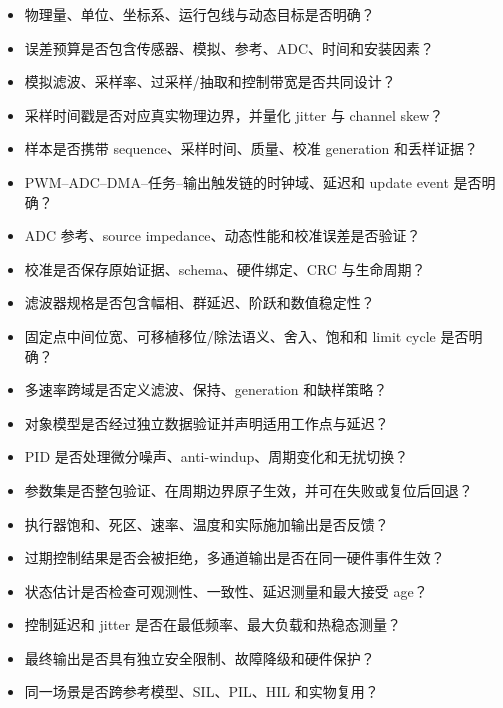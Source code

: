 \begin{itemize}
  \item 物理量、单位、坐标系、运行包线与动态目标是否明确？
  \item 误差预算是否包含传感器、模拟、参考、ADC、时间和安装因素？
  \item 模拟滤波、采样率、过采样/抽取和控制带宽是否共同设计？
  \item 采样时间戳是否对应真实物理边界，并量化 jitter 与 channel skew？
  \item 样本是否携带 sequence、采样时间、质量、校准 generation 和丢样证据？
  \item PWM--ADC--DMA--任务--输出触发链的时钟域、延迟和 update event 是否明确？
  \item ADC 参考、source impedance、动态性能和校准误差是否验证？
  \item 校准是否保存原始证据、schema、硬件绑定、CRC 与生命周期？
  \item 滤波器规格是否包含幅相、群延迟、阶跃和数值稳定性？
  \item 固定点中间位宽、可移植移位/除法语义、舍入、饱和和 limit cycle 是否明确？
  \item 多速率跨域是否定义滤波、保持、generation 和缺样策略？
  \item 对象模型是否经过独立数据验证并声明适用工作点与延迟？
  \item PID 是否处理微分噪声、anti-windup、周期变化和无扰切换？
  \item 参数集是否整包验证、在周期边界原子生效，并可在失败或复位后回退？
  \item 执行器饱和、死区、速率、温度和实际施加输出是否反馈？
  \item 过期控制结果是否会被拒绝，多通道输出是否在同一硬件事件生效？
  \item 状态估计是否检查可观测性、一致性、延迟测量和最大接受 age？
  \item 控制延迟和 jitter 是否在最低频率、最大负载和热稳态测量？
  \item 最终输出是否具有独立安全限制、故障降级和硬件保护？
  \item 同一场景是否跨参考模型、SIL、PIL、HIL 和实物复用？
\end{itemize}
